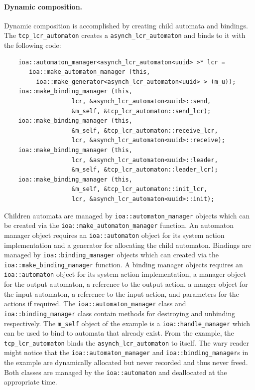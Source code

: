 \paragraph{Dynamic composition.}
Dynamic composition is accomplished by creating child automata and bindings.
The \verb+tcp_lcr_automaton+ creates a \verb+asynch_lcr_automaton+ and binds to it with the following code:
\begin{lstlisting}
    ioa::automaton_manager<asynch_lcr_automaton<uuid> >* lcr =
       ioa::make_automaton_manager (this,
         ioa::make_generator<asynch_lcr_automaton<uuid> > (m_u));
    ioa::make_binding_manager (this,
			       lcr, &asynch_lcr_automaton<uuid>::send,
			       &m_self, &tcp_lcr_automaton::send_lcr);
    ioa::make_binding_manager (this,
			       &m_self, &tcp_lcr_automaton::receive_lcr,
			       lcr, &asynch_lcr_automaton<uuid>::receive);
    ioa::make_binding_manager (this,
			       lcr, &asynch_lcr_automaton<uuid>::leader,
			       &m_self, &tcp_lcr_automaton::leader_lcr);
    ioa::make_binding_manager (this,
			       &m_self, &tcp_lcr_automaton::init_lcr,
			       lcr, &asynch_lcr_automaton<uuid>::init);
\end{lstlisting}
Children automata are managed by \verb+ioa::automaton_manager+ objects which can be created via the \verb+ioa::make_automaton_manager+ function.
An automaton manager object requires an \verb+ioa::automaton+ object for its system action implementation and a generator for allocating the child automaton.
Bindings are managed by \verb+ioa::binding_manager+ objects which can created via the \verb+ioa::make_binding_manager+ function.
A binding manager objects requires an \verb+ioa::automaton+ object for its system action implementation, a manager object for the output automaton, a reference to the output action, a manger object for the input automaton, a reference to the input action, and parameters for the actions if required.
The \verb+ioa::automaton_manager+ class and \verb+ioa::binding_manager+ class contain methods for destroying and unbinding respectively.
The \verb+m_self+ object of the example is a \verb+ioa::handle_manager+ which can be used to bind to automata that already exist.
From the example, the \verb+tcp_lcr_automaton+ binds the \verb+asynch_lcr_automaton+ to itself.
The wary reader might notice that the \verb+ioa::automaton_manager+ and \verb+ioa::binding_manager+s in the example are dynamically allocated but never recorded and thus never freed.
Both classes are managed by the \verb+ioa::automaton+ and deallocated at the appropriate time.

